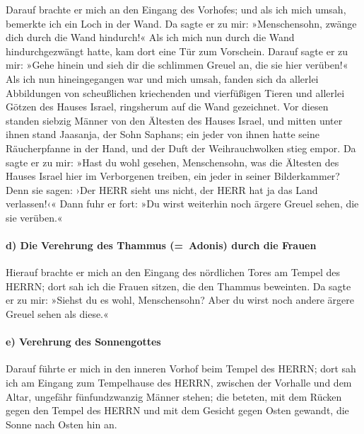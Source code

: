 Darauf brachte er mich an den Eingang des Vorhofes; und
als ich mich umsah, bemerkte ich ein Loch in der Wand. Da
sagte er zu mir: »Menschensohn, zwänge dich durch die Wand hindurch!«
Als ich mich nun durch die Wand hindurchgezwängt hatte, kam dort eine
Tür zum Vorschein. Darauf sagte er zu mir: »Gehe hinein
und sieh dir die schlimmen Greuel an, die sie hier verüben!«
Als ich nun hineingegangen war und mich umsah, fanden
sich da allerlei Abbildungen von scheußlichen kriechenden und
vierfüßigen Tieren und allerlei Götzen des Hauses Israel, ringsherum auf
die Wand gezeichnet. Vor diesen standen siebzig Männer
von den Ältesten des Hauses Israel, und mitten unter ihnen stand
Jaasanja, der Sohn Saphans; ein jeder von ihnen hatte seine
Räucherpfanne in der Hand, und der Duft der Weihrauchwolken stieg empor.
Da sagte er zu mir: »Hast du wohl gesehen, Menschensohn,
was die Ältesten des Hauses Israel hier im Verborgenen treiben, ein
jeder in seiner Bilderkammer? Denn sie sagen: ›Der HERR sieht uns nicht,
der HERR hat ja das Land verlassen!‹« Dann fuhr er fort:
»Du wirst weiterhin noch ärgere Greuel sehen, die sie verüben.«

\hypertarget{d-die-verehrung-des-thammus-adonis-durch-die-frauen}{%
\paragraph{d) Die Verehrung des Thammus (=~Adonis) durch die
Frauen}\label{d-die-verehrung-des-thammus-adonis-durch-die-frauen}}

Hierauf brachte er mich an den Eingang des nördlichen
Tores am Tempel des HERRN; dort sah ich die Frauen sitzen, die den
Thammus beweinten. Da sagte er zu mir: »Siehst du es
wohl, Menschensohn? Aber du wirst noch andere ärgere Greuel sehen als
diese.«

\hypertarget{e-verehrung-des-sonnengottes}{%
\paragraph{e) Verehrung des
Sonnengottes}\label{e-verehrung-des-sonnengottes}}

Darauf führte er mich in den inneren Vorhof beim Tempel
des HERRN; dort sah ich am Eingang zum Tempelhause des HERRN, zwischen
der Vorhalle und dem Altar, ungefähr fünfundzwanzig Männer stehen; die
beteten, mit dem Rücken gegen den Tempel des HERRN und mit dem Gesicht
gegen Osten gewandt, die Sonne nach Osten hin an.

